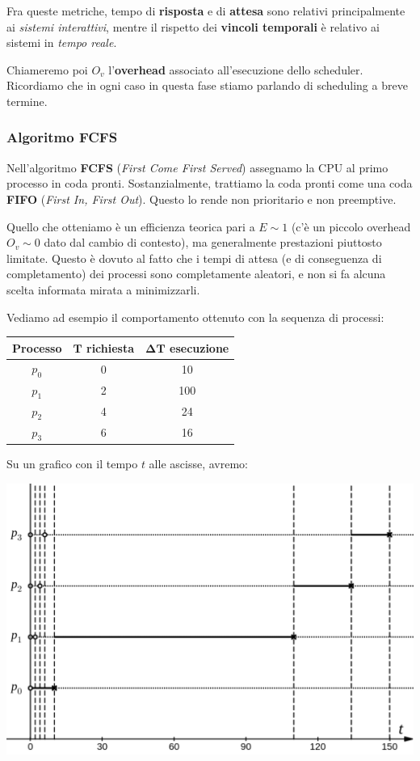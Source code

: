 \documentclass[a4paper,11pt]{article}
\begin{document}
Fra queste metriche, tempo di \textbf{risposta} e di \textbf{attesa} sono relativi principalmente ai \textit{sistemi interattivi}, mentre il rispetto dei \textbf{vincoli temporali} è relativo ai sistemi in \textit{tempo reale}.

Chiameremo poi $O_v$ l'\textbf{overhead} associato all'esecuzione dello scheduler. Ricordiamo che in ogni caso in questa fase stiamo parlando di scheduling a breve termine.

\subsubsection{Algoritmo FCFS}
Nell'algoritmo \textbf{FCFS} (\textit{First Come First Served}) assegnamo la CPU al primo processo in coda pronti. Sostanzialmente, trattiamo la coda pronti come una coda \textbf{FIFO} (\textit{First In, First Out}).
Questo lo rende non prioritario e non preemptive.

Quello che otteniamo è un efficienza teorica pari a $E\sim1$ (c'è un piccolo overhead $O_v \sim 0$ dato dal cambio di contesto), ma generalmente prestazioni piuttosto limitate.
Questo è dovuto al fatto che i tempi di attesa (e di conseguenza di completamento) dei processi sono completamente aleatori, e non si fa alcuna scelta informata mirata a minimizzarli.

\newpage

Vediamo ad esempio il comportamento ottenuto con la sequenza di processi:
\begin{table}[H]
	\center {}
	\begin{tabular} { c || c | c }
		\bfseries Processo & \bfseries $\mathbf{T}$ richiesta & \bfseries $\mathbf{\Delta T}$ esecuzione \\
		\hline
		$p_0$ & 0 & 10 \\ 
		$p_1$ & 2 & 100 \\ 
		$p_2$ & 4 & 24 \\ 
		$p_3$ & 6 & 16 
	\end{tabular}
\end{table}

Su un grafico con il tempo $t$ alle ascisse, avremo:
\begin{center}
	\includegraphics[scale=0.3]{../figures/fcfs_bad.png}
\end{center}
\end{document}
